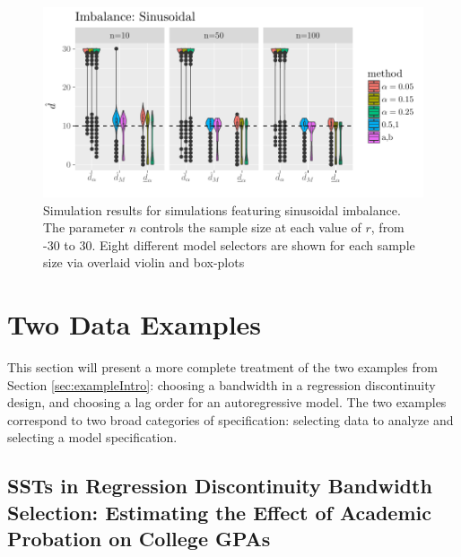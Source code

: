 \documentclass[12pt]{article}\usepackage[]{graphicx}\usepackage[]{color}
\makeatletter
\def\maxwidth{ %
  \ifdim\Gin@nat@width>\linewidth
    \linewidth
  \else
    \Gin@nat@width
  \fi
}
\makeatother
\begin{document}
\begin{figure}

\includegraphics[width=\maxwidth]{figure/sinusoidalImbalance-1} 

\caption{Simulation results for simulations featuring sinusoidal
  imbalance. The parameter $n$ controls the sample size at each value
  of $r$, from -30 to 30. Eight different model selectors are shown
  for each sample size via overlaid violin and box-plots}
\label{fig:sinImb}
\end{figure}




\section{Two Data Examples}\label{sec:examples}

This section will present a more complete treatment of the two
examples from Section \ref{sec:exampleIntro}: choosing a bandwidth in
a regression discontinuity design, and choosing a lag order for an
autoregressive model.
The two examples correspond to two broad categories of
specification: selecting data to analyze and
selecting a model specification.

\subsection{SSTs in Regression Discontinuity Bandwidth Selection:
  Estimating the Effect of  Academic Probation on College GPAs}
\end{document}

